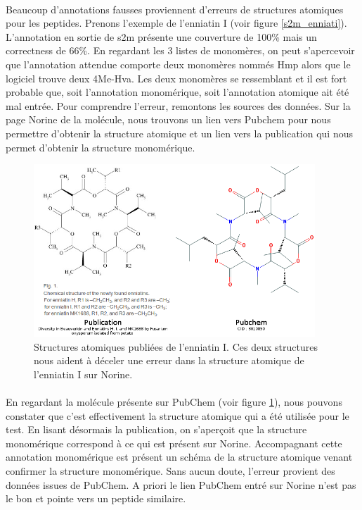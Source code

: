 \documentclass[12pt,french,twoside]{report}
\begin{document}
\paragraph{}Beaucoup d'annotations fausses proviennent d'erreurs de structures atomiques pour les peptides.
Prenons l'exemple de l'enniatin I (voir figure \ref{s2m_enniati}).
L'annotation en sortie de s2m présente une couverture de 100\% mais un correctness de 66\%.
En regardant les 3 listes de monomères, on peut s'apercevoir que l'annotation attendue comporte deux monomères nommés Hmp alors que le logiciel trouve deux 4Me-Hva.
Les deux monomères se ressemblant et il est fort probable que, soit l'annotation monomérique, soit l'annotation atomique ait été mal entrée.
Pour comprendre l'erreur, remontons les sources des données.
Sur la page Norine de la molécule, nous trouvons un lien vers Pubchem pour nous permettre d'obtenir la structure atomique et un lien vers la publication qui nous permet d'obtenir la structure monomérique.

\begin{figure}[h!]
  \begin{center}
    \includegraphics[width=400px]{Figures/s2m/results/enniatinI_corrections.png}
    \caption{\label{enni_cor}Structures atomiques publiées de l'enniatin I.
    Ces deux structures nous aident à déceler une erreur dans la structure atomique de l'enniatin I sur Norine.}
  \end{center}
\end{figure}

\paragraph{}En regardant la molécule présente sur PubChem (voir figure \ref{enni_cor}), nous pouvons constater que c'est effectivement la structure atomique qui a été utilisée pour le test.
En lisant désormais la publication, on s'aperçoit que la structure monomérique correspond à ce qui est présent sur Norine.
Accompagnant cette annotation monomérique est présent un schéma de la structure atomique venant confirmer la structure monomérique.
Sans aucun doute, l'erreur provient des données issues de PubChem.
A priori le lien PubChem entré sur Norine n'est pas le bon et pointe vers un peptide similaire.
\end{document}
